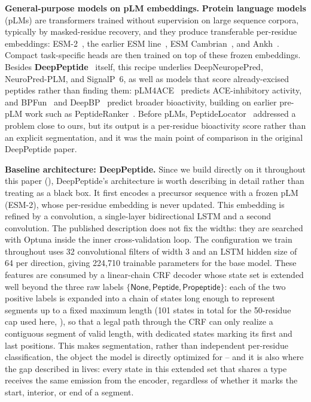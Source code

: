 \documentclass{article}
\begin{document}
\textbf{General-purpose models on pLM embeddings.} \textbf{Protein language models} (pLMs) are transformers trained without supervision on large sequence corpora, typically by masked-residue recovery, and they produce transferable per-residue embeddings: ESM-2~\citep{lin2023esm2}, the earlier ESM line~\citep{esm2_2019}, ESM Cambrian~\citep{esm_cambrian_blog_2024,ESM-family}, and Ankh~\citep{ankh2023}. Compact task-specific heads are then trained on top of these frozen embeddings. Besides \textbf{DeepPeptide}~\citep{deeppeptide2023} itself, this recipe underlies DeepNeuropePred, NeuroPred-PLM, and SignalP~6, as well as models that score already-excised peptides rather than finding them: pLM4ACE~\citep{du2024plm4ace} predicts ACE-inhibitory activity, and BPFun~\citep{bpfun2025} and DeepBP~\citep{zhang2024deepbp} predict broader bioactivity, building on earlier pre-pLM work such as PeptideRanker~\citep{mooney2012peptideranker}. Before pLMs, PeptideLocator~\citep{mooney2013peptidelocator} addressed a problem close to ours, but its output is a per-residue bioactivity score rather than an explicit segmentation, and it was the main point of comparison in the original DeepPeptide paper.

\textbf{Baseline architecture: DeepPeptide.} Since we build directly on it throughout this paper (), DeepPeptide's architecture is worth describing in detail rather than treating as a black box. It first encodes a precursor sequence with a frozen pLM (ESM-2), whose per-residue embedding is never updated. This embedding is refined by a convolution, a single-layer bidirectional LSTM and a second convolution. The published description does not fix the widths: they are searched with Optuna inside the inner cross-validation loop. The configuration we train throughout uses 32 convolutional filters of width 3 and an LSTM hidden size of 64 per direction, giving 224{,}710 trainable parameters for the base model. These features are consumed by a linear-chain CRF decoder whose state set is extended well beyond the three raw labels $\{\textsf{None}, \textsf{Peptide}, \textsf{Propeptide}\}$: each of the two positive labels is expanded into a chain of states long enough to represent segments up to a fixed maximum length (101 states in total for the 50-residue cap used here, ), so that a legal path through the CRF can only realize a contiguous segment of valid length, with dedicated states marking its first and last positions. This makes segmentation, rather than independent per-residue classification, the object the model is directly optimized for -- and it is also where the gap described in  lives: every state in this extended set that shares a type receives the same emission from the encoder, regardless of whether it marks the start, interior, or end of a segment.
\end{document}
